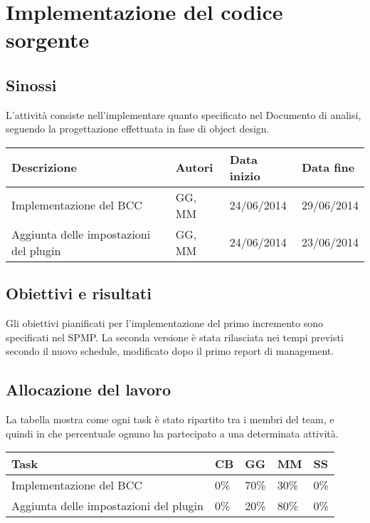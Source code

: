 \section{Implementazione del codice sorgente}
\subsection{Sinossi}
L'attività consiste nell'implementare quanto specificato nel Documento di analisi, seguendo la progettazione effettuata in fase di object design.

\begin{table}[ht]
 \begin{tabular}{|p{6cm}|p{2cm}|p{2cm}|p{2cm}|}
    \hline
    \rowcolor{Gray}\textbf{Descrizione}			& \textbf{Autori}		& \textbf{Data inizio}			& \textbf{Data fine}	\\
    \hline
    Implementazione del BCC				& GG, MM			& 24/06/2014				& 29/06/2014		\\
    \hline
    Aggiunta delle impostazioni del plugin		& GG, MM			& 24/06/2014				& 23/06/2014		\\
    \hline
 \end{tabular}
\end{table}

\subsection{Obiettivi e risultati}
Gli obiettivi pianificati per l'implementazione del primo incremento sono specificati nel SPMP. La seconda versione è stata rilasciata nei tempi previsti secondo il nuovo schedule, modificato dopo il primo report di management.

\subsection{Allocazione del lavoro}
La tabella mostra come ogni task è stato ripartito tra i membri del team, e quindi in che percentuale ognuno ha partecipato a una determinata attività.
\begin{table}[ht]
 \centering
 \begin{tabular}{|p{7.5cm}|p{1cm}|p{1cm}|p{1cm}|p{1cm}|}
  \hline
  \rowcolor{Gray}\textbf{Task}			& \textbf{CB}		& \textbf{GG}		& \textbf{MM}		& \textbf{SS}		\\
  \hline
  Implementazione del BCC			& 0\%			& 70\%			& 30\%			& 0\%			\\
  \hline
  Aggiunta delle impostazioni del plugin	& 0\%			& 20\%			& 80\%			& 0\%			\\
  \hline
 \end{tabular}
\end{table}



